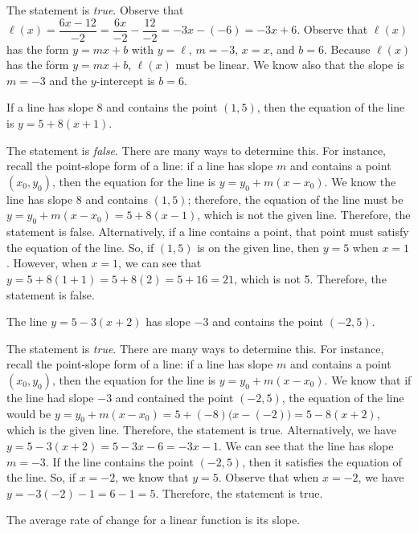 \documentclass[11pt,letterpaper]{article}
\begin{document}
\sol The statement is \textit{true}. Observe that $\ell(x)= \dfrac{6x - 12}{-2}= \dfrac{6x}{-2} - \dfrac{12}{-2}= -3x - (-6)= -3x + 6$. Observe that $\ell(x)$ has the form $y= mx + b$ with $y= \ell$, $m= -3$, $x= x$, and $b= 6$. Because $\ell(x)$ has the form $y= mx + b$, $\ell(x)$ must be linear. We know also that the slope is $m= -3$ and the $y$-intercept is $b= 6$. \pvspace{1.3cm}



 If a line has slope $8$ and contains the point $(1, 5)$, then the equation of the line is $y= 5 + 8(x + 1)$. \pspace

\sol The statement is \textit{false}. There are many ways to determine this. For instance, recall the point-slope form of a line: if a line has slope $m$ and contains a point $(x_0, y_0)$, then the equation for the line is $y= y_0 + m(x - x_0)$. We know the line has slope 8 and contains $(1, 5)$; therefore, the equation of the line must be $y= y_0 + m(x - x_0)= 5 + 8(x - 1)$, which is not the given line. Therefore, the statement is false. Alternatively, if a line contains a point, that point must satisfy the equation of the line. So, if $(1, 5)$ is on the given line, then $y= 5$ when $x= 1$. However, when $x= 1$, we can see that $y= 5 + 8(1 + 1)= 5 + 8(2)= 5 + 16= 21$, which is not 5. Therefore, the statement is false. \pvspace{1.3cm}



 The line $y= 5 - 3(x + 2)$ has slope $-3$ and contains the point $(-2, 5)$. \pspace

\sol The statement is \textit{true}. There are many ways to determine this. For instance, recall the point-slope form of a line: if a line has slope $m$ and contains a point $(x_0, y_0)$, then the equation for the line is $y= y_0 + m(x - x_0)$. We know that if the line had slope $-3$ and contained the point $(-2, 5)$, the equation of the line would be $y= y_0 + m(x - x_0)= 5 + (-8) \big(x - (-2) \big)= 5 - 8(x + 2)$, which is the given line. Therefore, the statement is true. Alternatively, we have $y= 5 - 3(x + 2)= 5 - 3x - 6= -3x - 1$. We can see that the line has slope $m= -3$. If the line contains the point $(-2, 5)$, then it satisfies the equation of the line. So, if $x= -2$, we know that $y= 5$. Observe that when $x= -2$, we have $y= -3(-2) - 1= 6 - 1= 5$. Therefore, the statement is true. \pvspace{1.3cm}



 The average rate of change for a linear function is its slope. \pspace
\end{document}
